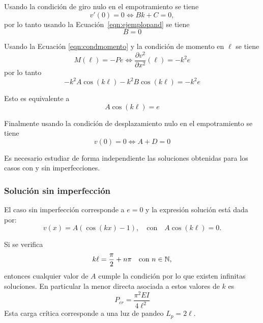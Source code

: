 Usando la condición de giro nulo en el empotramiento se tiene
\begin{equation}
v'(0)=0 \Leftrightarrow  Bk + C = 0,
\end{equation}
%
por lo tanto usando la Ecuación~\eqref{eqn:ejemplopand} se tiene
\begin{equation}
\boxed{
B=0
}
\end{equation}

Usando la Ecuación \eqref{eqn:condmomento} y la condición de momento en $\ell$ se tiene
%
\begin{equation}
M(\ell) = -P e \Leftrightarrow \frac{\partial v^2}{\partial x^2} (\ell)  = - k^2 e
\end{equation}
%
por lo tanto
%
\begin{equation}
-k^2 A \cos(k\ell) - k^2 B \cos(k\ell) = -k^2 e
\end{equation}

Esto es equivalente a 
\begin{equation}\label{eqn:acos}
\boxed{
A \cos(k\ell)  = e
}
\end{equation}

Finalmente usando la condición de desplazamiento nulo en el empotramiento se tiene
%
\begin{equation}
v(0)=0  \Leftrightarrow \boxed{ A + D = 0}
\end{equation}

Es necesario estudiar de forma independiente las soluciones obtenidas para los casos con y sin imperfecciones.

\subsubsection{Solución sin imperfección}

El caso sin imperfección corresponde a $e=0$ y la expresión solución está dada por:
%
\begin{equation}
v(x) = A (\cos(k x) -1), \quad \text{con} \quad A\cos(k\ell) = 0.
\end{equation}

Si se verifica
%
\begin{equation}
k \ell = \frac{\pi}{2} + n\pi  \quad \text{con} \,\, n\in {\mathbb N},
\end{equation}
%
entonces cualquier valor de $A$ cumple la condición por lo que existen infinitas soluciones. %
%
En particular la menor directa asociada a estos valores de $k$ es
\begin{equation}
\boxed{
P_{cr} = \frac{\pi^2 E I}{4 \ell^2}}
\end{equation}
%
Esta carga crítica corresponde a una luz de pandeo $L_p = 2\ell$.

